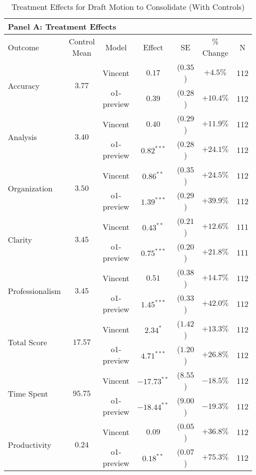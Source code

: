 \begin{table}[!htbp]
\centering
\caption{Treatment Effects for Draft Motion to Consolidate (With Controls)}
\label{tab:task5_effects_controls}
\vspace{0.3cm}
\begin{tabular}{lcccccc}
\multicolumn{7}{l}{\textbf{Panel A: Treatment Effects}} \\
\hline\hline
Outcome & Control Mean & Model & Effect & SE & \% Change & N \\
\hline
\multirow{2}{*}{Accuracy} & \multirow{2}{*}{$3.77$} & Vincent & $0.17$ & ($0.35$) & $+4.5\%$ & 112 \\
& & o1-preview & $0.39$ & ($0.28$) & $+10.4\%$ & 112 \\
\hline
\multirow{2}{*}{Analysis} & \multirow{2}{*}{$3.40$} & Vincent & $0.40$ & ($0.29$) & $+11.9\%$ & 112 \\
& & o1-preview & $0.82^{***}$ & ($0.28$) & $+24.1\%$ & 112 \\
\hline
\multirow{2}{*}{Organization} & \multirow{2}{*}{$3.50$} & Vincent & $0.86^{**}$ & ($0.35$) & $+24.5\%$ & 112 \\
& & o1-preview & $1.39^{***}$ & ($0.29$) & $+39.9\%$ & 112 \\
\hline
\multirow{2}{*}{Clarity} & \multirow{2}{*}{$3.45$} & Vincent & $0.43^{**}$ & ($0.21$) & $+12.6\%$ & 111 \\
& & o1-preview & $0.75^{***}$ & ($0.20$) & $+21.8\%$ & 111 \\
\hline
\multirow{2}{*}{Professionalism} & \multirow{2}{*}{$3.45$} & Vincent & $0.51$ & ($0.38$) & $+14.7\%$ & 112 \\
& & o1-preview & $1.45^{***}$ & ($0.33$) & $+42.0\%$ & 112 \\
\hline
\multirow{2}{*}{Total Score} & \multirow{2}{*}{$17.57$} & Vincent & $2.34^{*}$ & ($1.42$) & $+13.3\%$ & 112 \\
& & o1-preview & $4.71^{***}$ & ($1.20$) & $+26.8\%$ & 112 \\
\hline
\multirow{2}{*}{Time Spent} & \multirow{2}{*}{$95.75$} & Vincent & $-17.73^{**}$ & ($8.55$) & $-18.5\%$ & 112 \\
& & o1-preview & $-18.44^{**}$ & ($9.00$) & $-19.3\%$ & 112 \\
\hline
\multirow{2}{*}{Productivity} & \multirow{2}{*}{$0.24$} & Vincent & $0.09$ & ($0.05$) & $+36.8\%$ & 112 \\
& & o1-preview & $0.18^{**}$ & ($0.07$) & $+75.3\%$ & 112 \\
\hline
\end{tabular}


\end{table}
